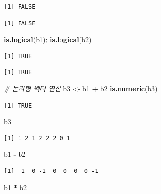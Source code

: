 \documentclass[
  11pt,
]{krantz}
\newenvironment{Shaded}{\begin{snugshade}}{\end{snugshade}}
\newcommand{\CommentTok}[1]{\textcolor[rgb]{0.37,0.37,0.37}{\textit{#1}}}
\newcommand{\KeywordTok}[1]{\textcolor[rgb]{0.27,0.27,0.27}{\textbf{#1}}}
\newcommand{\NormalTok}[1]{#1}
\newcommand{\OperatorTok}[1]{\textcolor[rgb]{0.43,0.43,0.43}{\textbf{#1}}}
\newcommand{\StringTok}[1]{\textcolor[rgb]{0.5,0.5,0.5}{#1}}
\begin{document}
\begin{verbatim}
[1] FALSE
\end{verbatim}

\begin{verbatim}
[1] FALSE
\end{verbatim}

\begin{Shaded}
\begin{Highlighting}[]
\KeywordTok{is.logical}\NormalTok{(b1); }\KeywordTok{is.logical}\NormalTok{(b2)}
\end{Highlighting}
\end{Shaded}

\begin{verbatim}
[1] TRUE
\end{verbatim}

\begin{verbatim}
[1] TRUE
\end{verbatim}

\begin{Shaded}
\begin{Highlighting}[]
\CommentTok{# 논리형 벡터 연산}
\NormalTok{b3 <-}\StringTok{ }\NormalTok{b1 }\OperatorTok{+}\StringTok{ }\NormalTok{b2}
\KeywordTok{is.numeric}\NormalTok{(b3)}
\end{Highlighting}
\end{Shaded}

\begin{verbatim}
[1] TRUE
\end{verbatim}

\begin{Shaded}
\begin{Highlighting}[]
\NormalTok{b3}
\end{Highlighting}
\end{Shaded}

\begin{verbatim}
[1] 1 2 1 2 2 2 0 1
\end{verbatim}

\begin{Shaded}
\begin{Highlighting}[]
\NormalTok{b1 }\OperatorTok{-}\StringTok{ }\NormalTok{b2}
\end{Highlighting}
\end{Shaded}

\begin{verbatim}
[1]  1  0 -1  0  0  0  0 -1
\end{verbatim}

\begin{Shaded}
\begin{Highlighting}[]
\NormalTok{b1 }\OperatorTok{*}\StringTok{ }\NormalTok{b2}
\end{Highlighting}
\end{Shaded}
\end{document}
